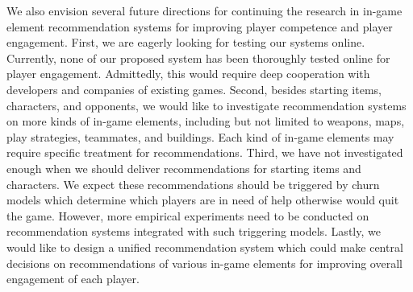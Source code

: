 We also envision several future directions for continuing the research in in-game element recommendation systems for improving player competence and player engagement. First, we are eagerly looking for testing our systems online. Currently, none of our proposed system has been thoroughly tested online for player engagement. Admittedly, this would require deep cooperation with developers and companies of existing games. Second, besides starting items, characters, and opponents, we would like to investigate recommendation systems on more kinds of in-game elements, including but not limited to weapons, maps, play strategies, teammates, and buildings. Each kind of in-game elements may require specific treatment for recommendations. Third, we have not investigated enough when we should deliver recommendations for starting items and characters. We expect these recommendations should be triggered by churn models which determine which players are in need of help otherwise would quit the game. However, more empirical experiments need to be conducted on recommendation systems integrated with such triggering models. Lastly, we would like to design a unified recommendation system which could make central decisions on recommendations of various in-game elements for improving overall engagement of each player. 

